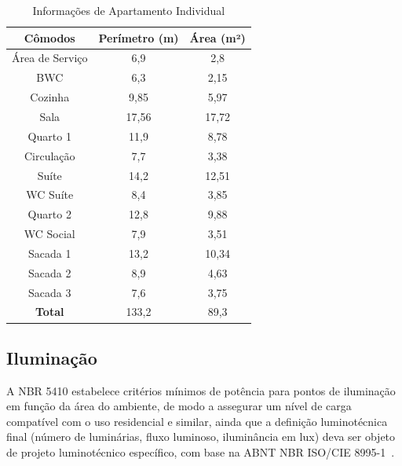 \documentclass[12pt,openright,oneside,a4paper,brazil]{abntex2}
\begin{document}
\begin{table}[H]
\centering
\caption{Informações de Apartamento Individual}
\label{tab:apartamento_individual}

\renewcommand{\arraystretch}{1.1} %
\setlength{\tabcolsep}{12pt}      %

\begin{tabular}{c c c}
\toprule
\textbf{Cômodos} & \textbf{Perímetro \small{(m)}} & \textbf{Área \small{(m²)}} \\
\midrule
Área de Serviço	& 6,9     & 2,8 \\
BWC	            & 6,3     & 2,15 \\
Cozinha	        & 9,85    & 5,97 \\
Sala	        & 17,56   & 17,72 \\
Quarto 1	    & 11,9    & 8,78 \\
Circulação	    & 7,7     & 3,38 \\
Suíte           & 14,2    & 12,51 \\
WC Suíte        & 8,4     & 3,85 \\
Quarto 2        & 12,8    & 9,88 \\
WC Social       & 7,9     & 3,51 \\
Sacada 1        & 13,2    & 10,34 \\
Sacada 2        & 8,9     & 4,63 \\
Sacada 3        & 7,6     & 3,75 \\
\midrule \rowcolor[HTML]{ffc187}
\textbf{Total}  & 133,2   & 89,3  \\
\bottomrule
\end{tabular}
\end{table}

\subsection{Iluminação}

\hspace{1.27cm} A NBR 5410 estabelece critérios mínimos de potência para pontos de
iluminação em função da área do ambiente, de modo a assegurar um nível de
carga compatível com o uso residencial e similar, ainda que a definição
luminotécnica final (número de luminárias, fluxo luminoso, iluminância em
lux) deva ser objeto de projeto luminotécnico específico, com base na
ABNT NBR ISO/CIE 8995-1~\cite{nbr8995}.
\end{document}
